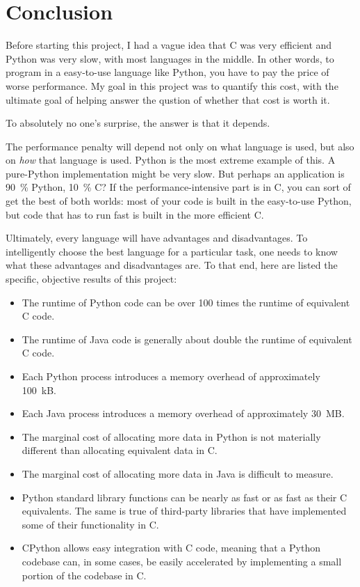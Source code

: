 \documentclass[12pt,letterpaper]{article}
\begin{document}
\section{Conclusion}\label{conclusion}

Before starting this project, I had a vague idea that C was very efficient and
Python was very slow, with most languages in the middle. In other words, to
program in a easy-to-use language like Python, you have to pay the price of
worse performance. My goal in this project was to quantify this cost, with the
ultimate goal of helping answer the qustion of whether that cost is worth it.

To absolutely no one's surprise, the answer is that it depends.

The performance penalty will depend not only on what language is used, but also
on \emph{how} that language is used. Python is the most extreme example of
this. A pure-Python implementation might be very slow. But perhaps an
application is \SI{90}{\%} Python, \SI{10}{\%} C? If the performance-intensive
part is in C, you can sort of get the best of both worlds: most of your code is
built in the easy-to-use Python, but code that has to run fast is built in the
more efficient C.

Ultimately, every language will have advantages and disadvantages. To
intelligently choose the best language for a particular task, one needs to know
what these advantages and disadvantages are. To that end, here are listed the
specific, objective results of this project:

\begin{itemize}
  \item The runtime of Python code can be over 100 times the runtime of
    equivalent C code.
  \item The runtime of Java code is generally about double the runtime of
    equivalent C code.
  \item Each Python process introduces a memory overhead of approximately
    \SI{100}{\kilo B}.
  \item Each Java process introduces a memory overhead of approximately
    \SI{30}{\mega B}.
  \item The marginal cost of allocating more data in Python is not materially
    different than allocating equivalent data in C.
  \item The marginal cost of allocating more data in Java is difficult to
    measure.
  \item Python standard library functions can be nearly as fast or as fast as
    their C equivalents. The same is true of third-party libraries that have
    implemented some of their functionality in C.
  \item CPython allows easy integration with C code, meaning that a Python
    codebase can, in some cases, be easily accelerated by implementing a small
    portion of the codebase in C.
\end{itemize}
\end{document}
